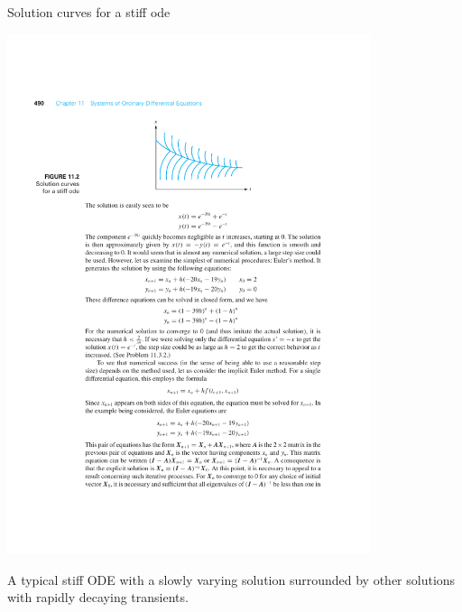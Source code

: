 \documentclass{beamer}
\begin{document}
\begin{frame}{Solution curves   for a stiff ode}
    \centerline{\includegraphics[width=0.8\textwidth]{Lec13_Fig6.pdf}}

 A typical stiff ODE with a slowly
        varying solution surrounded by other solutions with rapidly decaying transients.

\end{frame}
\end{document}
